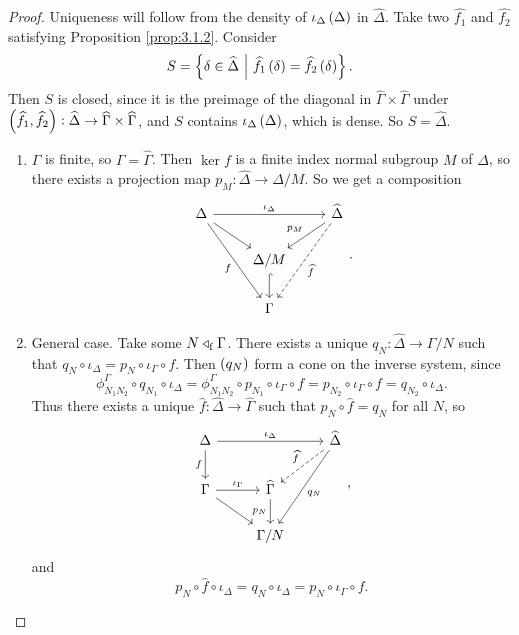 \begin{proof}
Uniqueness will follow from the density of $ \iota_\Delta\br{\Delta} $ in $ \widehat{\Delta} $. Take two $ \widehat{f_1} $ and $ \widehat{f_2} $ satisfying Proposition \ref{prop:3.1.2}. Consider
$$ S = \cbr{\delta \in \widehat{\Delta} \st \widehat{f_1}\br{\delta} = \widehat{f_2}\br{\delta}}. $$
Then $ S $ is closed, since it is the preimage of the diagonal in $ \widehat{\Gamma} \times \widehat{\Gamma} $ under $ \br{\widehat{f_1}, \widehat{f_2}} : \widehat{\Delta} \to \widehat{\Gamma} \times \widehat{\Gamma} $, and $ S $ contains $ \iota_\Delta\br{\Delta} $, which is dense. So $ S = \widehat{\Delta} $.
\begin{enumerate}[leftmargin=0.5in, label=Case \arabic*.]
\item $ \Gamma $ is finite, so $ \Gamma = \widehat{\Gamma} $. Then $ \ker f $ is a finite index normal subgroup $ M $ of $ \Delta $, so there exists a projection map $ p_M : \widehat{\Delta} \to \Delta / M $. So we get a composition
$$
\begin{tikzcd}
\Delta \arrow{rr}{\iota_\Delta} \arrow{dr} \arrow{ddr}[swap]{f} & & \widehat{\Delta} \arrow{dl}[swap]{p_M} \arrow[dashed]{ddl}{\widehat{f}} \\
& \Delta / M \arrow[hookrightarrow]{d} & \\
& \Gamma &
\end{tikzcd}.
$$
\item General case. Take some $ N \triangleleft_{\mathrm{f}} \Gamma $. There exists a unique $ q_N : \widehat{\Delta} \to \Gamma / N $ such that $ q_N \circ \iota_\Delta = p_N \circ \iota_\Gamma \circ f $. Then $ \br{q_N} $ form a cone on the inverse system, since
$$ \phi_{N_1N_2}^\Gamma \circ q_{N_1} \circ \iota_\Delta = \phi_{N_1N_2}^\Gamma \circ p_{N_1} \circ \iota_\Gamma \circ f = p_{N_2} \circ \iota_\Gamma \circ f = q_{N_2} \circ \iota_\Delta. $$
Thus there exists a unique $ \widehat{f} : \widehat{\Delta} \to \widehat{\Gamma} $ such that $ p_N \circ \widehat{f} = q_N $ for all $ N $, so
$$
\begin{tikzcd}
\Delta \arrow{rr}{\iota_\Delta} \arrow{d}[swap]{f} & & \widehat{\Delta} \arrow[dashed]{dl}[swap]{\widehat{f}} \arrow{ddl}{q_N} \\
\Gamma \arrow{r}{\iota_\Gamma} \arrow{dr} & \widehat{\Gamma} \arrow{d}[swap]{p_N} & \\
& \Gamma / N &
\end{tikzcd},
$$
and
$$ p_N \circ \widehat{f} \circ \iota_\Delta = q_N \circ \iota_\Delta = p_N \circ \iota_\Gamma \circ f. $$
\end{enumerate}
\end{proof}

